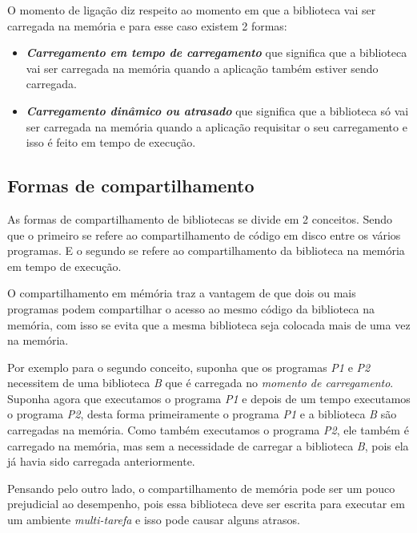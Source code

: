 O momento de ligação diz respeito ao momento em que a biblioteca vai ser carregada na memória e
para esse caso existem 2 formas:

\begin{itemize}

 \item \emph{\textbf{Carregamento em tempo de carregamento}} que significa que a biblioteca vai ser
 carregada na memória quando a aplicação também estiver sendo carregada.

 \item \emph{\textbf{Carregamento dinâmico ou atrasado}} que significa que a biblioteca só vai ser carregada na
 memória quando a aplicação requisitar o seu carregamento e isso é feito em tempo de execução.

\end{itemize}


\subsection{Formas de compartilhamento}
\label{subsection:formas_de_compartilhamento}

As formas de compartilhamento de bibliotecas se divide em 2 conceitos. Sendo que o primeiro se refere
ao compartilhamento de código em disco entre os vários programas. E o segundo se refere ao
compartilhamento da biblioteca na memória em tempo de execução.

O compartilhamento em mémória traz a vantagem de que dois ou mais programas podem
compartilhar o acesso ao mesmo código da biblioteca na memória, com isso se evita que a mesma
biblioteca seja colocada mais de uma vez na memória.

Por exemplo para o segundo conceito, suponha que os programas \emph{P1} e \emph{P2} necessitem de
uma biblioteca \emph{B} que é carregada no \emph{momento de carregamento}. Suponha
agora que executamos o programa \emph{P1} e depois de um tempo executamos o programa \emph{P2}, desta
forma primeiramente o programa \emph{P1} e a biblioteca \emph{B} são carregadas na memória. Como
também executamos o programa \emph{P2}, ele também é carregado na memória, mas sem a necessidade de
carregar a biblioteca \emph{B}, pois ela já havia sido carregada anteriormente.

Pensando pelo outro lado, o compartilhamento de memória pode ser um pouco prejudicial
ao desempenho, pois essa biblioteca deve ser escrita para executar em um ambiente \emph{multi-tarefa}
e isso pode causar alguns atrasos.
